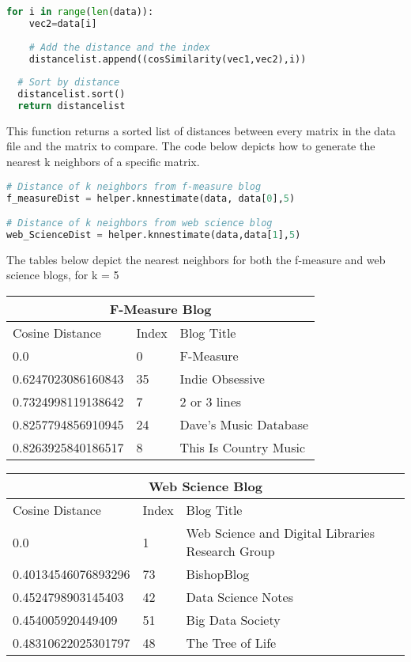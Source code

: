\documentclass[11pt]{scrartcl} %
\begin{document}
\begin{lstlisting}[language = Python, caption= get distances function]
for i in range(len(data)):
    vec2=data[i]
    
    # Add the distance and the index
    distancelist.append((cosSimilarity(vec1,vec2),i))
  
  # Sort by distance
  distancelist.sort()
  return distancelist
\end{lstlisting}

\tabto{2.0cm} This function returns a sorted list of distances between every matrix in the data file and the matrix to compare. The code below depicts how to generate the nearest k neighbors of a specific matrix.


\begin{lstlisting}[language = Python, caption= get distances of F-Measure and Web Science blogs]
# Distance of k neighbors from f-measure blog
f_measureDist = helper.knnestimate(data, data[0],5)

# Distance of k neighbors from web science blog
web_ScienceDist = helper.knnestimate(data,data[1],5)
\end{lstlisting}

\tabto{2.0cm} The tables below depict the nearest neighbors for both the f-measure and web science blogs, for k = 5
\bigskip
\begin{center}
\begin{tabular}{ |p{3cm}||p{3cm}|p{5cm} }
 \hline
 \multicolumn{3}{|c|}{F-Measure Blog} \\
 \hline
 Cosine Distance & Index & Blog Title\\
 \hline
 0.0 & 0 & F-Measure\\
 0.6247023086160843 & 35 & Indie Obsessive \\
 0.7324998119138642 & 7 & 2 or 3 lines \\
 0.8257794856910945 & 24 & Dave's Music Database\\
 0.8263925840186517 & 8 & This Is Country Music\\
 \hline
\end{tabular}
\end{center}

\bigskip

\begin{center}
\begin{tabular}{ |p{3cm}||p{3cm}|p{5cm}|  }
 \hline
 \multicolumn{3}{|c|}{Web Science Blog} \\
 \hline
 Cosine Distance & Index & Blog Title\\
 \hline
 0.0 & 1 & Web Science and Digital Libraries Research Group\\
 0.40134546076893296 & 73 & BishopBlog \\
 0.4524798903145403 & 42 & Data Science Notes\\
 0.454005920449409 & 51 & Big Data Society\\
 0.48310622025301797 & 48 & The Tree of Life \\
 \hline
\end{tabular}
\end{center}
\end{document}
